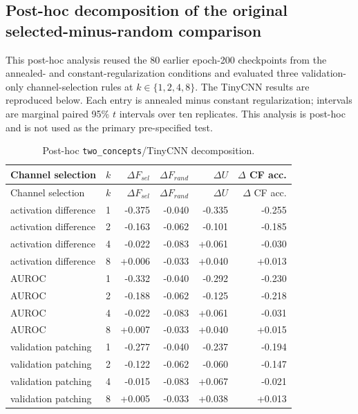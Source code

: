 \subsection{Post-hoc decomposition of the original selected-minus-random comparison}\label{app:development-decomposition}

This post-hoc analysis reused the 80 earlier epoch-200 checkpoints from the annealed- and constant-regularization conditions and evaluated three validation-only channel-selection rules at $k\in\{1,2,4,8\}$. The TinyCNN results are reproduced below. Each entry is annealed minus constant regularization; intervals are marginal paired 95\% $t$ intervals over ten replicates. This analysis is post-hoc and is not used as the primary pre-specified test.

{
\small
\setlength{\tabcolsep}{3pt}
\begin{longtable}{llrrrr}
\caption{Post-hoc \texttt{two\_concepts}/TinyCNN decomposition.}\label{tab:development-decomposition}\\
\toprule
Channel selection & $k$ & $\Delta F_{sel}$ & $\Delta F_{rand}$ & $\Delta U$ & $\Delta$ CF acc. \\
\midrule
\endfirsthead
\toprule
Channel selection & $k$ & $\Delta F_{sel}$ & $\Delta F_{rand}$ & $\Delta U$ & $\Delta$ CF acc. \\
\midrule
\endhead
\bottomrule
\endfoot
activation difference & 1 & -0.375 & -0.040 & -0.335 & -0.255 \\
activation difference & 2 & -0.163 & -0.062 & -0.101 & -0.185 \\
activation difference & 4 & -0.022 & -0.083 & +0.061 & -0.030 \\
activation difference & 8 & +0.006 & -0.033 & +0.040 & +0.013 \\
AUROC & 1 & -0.332 & -0.040 & -0.292 & -0.230 \\
AUROC & 2 & -0.188 & -0.062 & -0.125 & -0.218 \\
AUROC & 4 & -0.022 & -0.083 & +0.061 & -0.031 \\
AUROC & 8 & +0.007 & -0.033 & +0.040 & +0.015 \\
validation patching & 1 & -0.277 & -0.040 & -0.237 & -0.194 \\
validation patching & 2 & -0.122 & -0.062 & -0.060 & -0.147 \\
validation patching & 4 & -0.015 & -0.083 & +0.067 & -0.021 \\
validation patching & 8 & +0.005 & -0.033 & +0.038 & +0.013 \\
\end{longtable}
\normalsize
}

